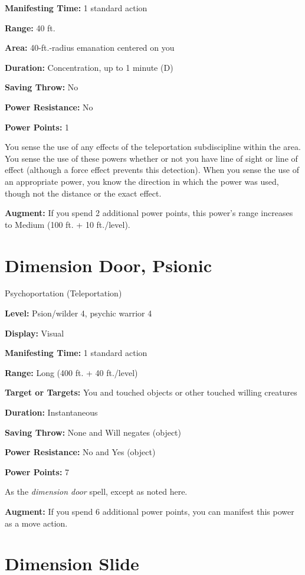 \documentclass{article}
\begin{document}
\textbf{Manifesting Time:} 1 standard action

\textbf{Range:} 40 ft.

\textbf{Area:} 40-ft.-radius emanation centered on you

\textbf{Duration:} Concentration, up to 1 minute (D)

\textbf{Saving Throw:} No

\textbf{Power Resistance:} No

\textbf{Power Points:} 1

You sense the use of any effects of the teleportation subdiscipline within the 
area. You sense the use of these powers whether or not you have line of sight or 
line of effect (although a force effect prevents this detection). When you sense 
the use of an appropriate power, you know the direction in which the power was 
used, though not the distance or the exact effect.

\textbf{Augment:} If you spend 2 additional power points, this power's range increases 
to Medium (100 ft. + 10 ft./level).

\vspace{12pt}
\section*{Dimension Door, Psionic}

Psychoportation (Teleportation)

\textbf{Level:} Psion/wilder 4, psychic warrior 4

\textbf{Display:} Visual

\textbf{Manifesting Time:} 1 standard action

\textbf{Range:} Long (400 ft. + 40 ft./level)

\textbf{Target or Targets:} You and touched objects or other touched willing creatures

\textbf{Duration:} Instantaneous

\textbf{Saving Throw:} None and Will negates (object)

\textbf{Power Resistance:} No and Yes (object)

\textbf{Power Points:} 7

As the \textit{dimension door }spell, except as noted here.

\textbf{Augment:} If you spend 6 additional power points, you can manifest this 
power as a move action. 

\vspace{12pt}
\section*{Dimension Slide}
\end{document}
